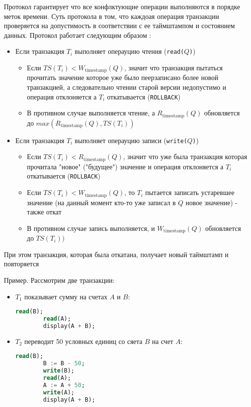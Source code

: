 Протокол гарантирует что все конфлктующие операции выполняются в порядке меток времени. Суть протокола в том, что каждоая операция транзакции проверяется на допустимость в соответствии с ее таймштампом и состоянием данных. Протокол работает следующим образом \autocite{Silberschatz}:

\begin{itemize}
    \item Если транзакция $T_i$ выполняет операуцию чтения (\texttt{read($Q$)})
    \begin{itemize}
        \item Если $TS(T_i) < W_{\text{timestamp}}(Q)$, значит что транзакция пытаться прочитать значение которое уже было пеерзаписано более новой транзакцией, а следовательно чтении старой версии недопустимо и операция отклоняется а $T_i$ откатывается (\texttt{ROLLBACK})
        \item В противном случае выполняется чтение, а $R_{\text{timestamp}}(Q)$ обновляется до $max(R_{\text{timestamp}}(Q), TS(T_i))$
    \end{itemize}

    \item Если транзакция $T_i$ выполняет операуцию записи (\texttt{write($Q$)})
    \begin{itemize}
        \item Если $TS(T_i) < R_{\text{timestamp}}(Q)$, значит что уже была транзакция которая прочитала "новое" ("будущее") значение и операция отклоняется а $T_i$ откатывается (\texttt{ROLLBACK})
        \item Если $TS(T_i) < W_{\text{timestamp}}(Q)$, то $T_i$ пытается записать устаревшее значение (на данный момент кто-то уже записал в $Q$ новое значение) - также откат
        \item В противном случае запись выполняется, и $W_{\text{timestamp}}(Q)$ обновляется до $TS(T_i))$ 
    \end{itemize}
\end{itemize}

При этом транзакция, которая была откатана, получает новый таймштамп и повторяется

Пример. Рассмотрим две транзакции:
\begin{itemize}
    \item $T_1$ показывает сумму на счетах $A$ и $B$:
    \begin{lstlisting}[language=SQL]
        read(B);
        read(A);
        display(A + B);           
    \end{lstlisting}

    \item $T_2$ переводит 50 условных единиц со сяета $B$ на счет $A$:
    \begin{lstlisting}[language=SQL]
        read(B);
        B := B - 50;
        write(B);
        read(A);
        A := A + 50;
        write(A);
        display(A + B);               
    \end{lstlisting}
\end{itemize}


